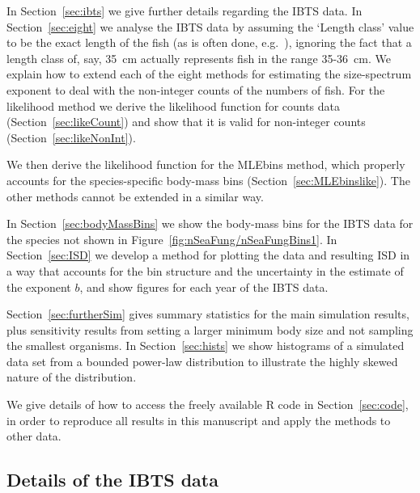 \documentclass[12pt, letter]{article}
\begin{document}
In Section~\ref{sec:ibts} we give further details regarding the IBTS data.
In Section~\ref{sec:eight} we analyse the IBTS data by assuming the
`Length class' value to be the
exact length of the fish (as is often done, e.g.~\citealt{blan05, dgpr05}),
ignoring the fact that a length class of, say, 35~cm actually represents fish in
the range 35-36~cm. We explain how to extend each of the eight methods for
estimating the size-spectrum exponent to deal with the non-integer counts of the
numbers of fish. For the likelihood method we derive the likelihood function
for counts data (Section~\ref{sec:likeCount}) and show that it is valid for
non-integer counts (Section~\ref{sec:likeNonInt}).

We then derive the likelihood function for the MLEbins method, which properly accounts
for the species-specific body-mass bins (Section~\ref{sec:MLEbinslike}).
The other methods cannot be extended in a similar way.

In Section~\ref{sec:bodyMassBins} we show the body-mass bins for the IBTS data for
the species not shown in Figure~\ref{fig:nSeaFung/nSeaFungBins1}. In
Section~\ref{sec:ISD} we develop a method for plotting the data and resulting
ISD in a way that accounts for the bin structure and the uncertainty in the
estimate of the exponent $b$, and show figures for each year of the IBTS data.

Section~\ref{sec:furtherSim} gives summary statistics for the main simulation
results, plus sensitivity results from setting a larger minimum body size
and not sampling the smallest organisms. In Section~\ref{sec:hists} we
show histograms of a simulated data set from a bounded power-law distribution
to illustrate the highly skewed nature of the distribution.

We give details of how to access the freely available R code in
Section~\ref{sec:code}, in order to reproduce all results in this manuscript and
apply the methods to other data.

\subsection{Details of the IBTS data\label{sec:ibts}}
\end{document}
